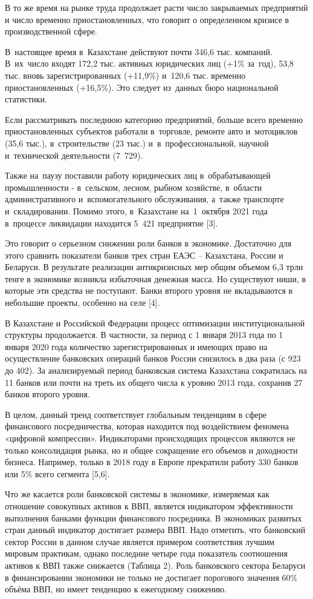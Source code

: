 В то же время на рынке труда продолжает расти число закрываемых
предприятий и число временно приостановленных, что говорит о
определенном кризисе в производственной сфере.

В~настоящее время в~Казахстане действуют почти 346,6 тыс. компаний.
В~их~число входят 172,2 тыс. активных юридических лиц (+1\% за~год),
53,8 тыс. вновь зарегистрированных (+11,9\%) и~120,6 тыс. временно
приостановленных (+16,5\%). Это следует из~данных бюро национальной
статистики.

Если рассматривать последнюю категорию предприятий, больше всего
временно приостановленных субъектов работали в~торговле, ремонте авто
и~мотоциклов (35,6 тыс.), в~строительстве (23 тыс.)
и~в~профессиональной, научной и~технической деятельности (7~729).

Также на~паузу поставили работу юридических лиц в~обрабатывающей
промышленности - в~сельском, лесном, рыбном хозяйстве, в~области
административного и~вспомогательного обслуживания, а~также транспорте
и~складировании. Помимо этого, в~Казахстане на~1~октября 2021 года
в~процессе ликвидации находится 5~421 предприятие {[}3{]}.

Это говорит о серьезном снижении роли банков в экономике. Достаточно для
этого сравнить показатели банков трех стран ЕАЭС -- Казахстана, России и
Беларуси. В результате реализации антикризисных мер общим объемом 6,3
трлн тенге в экономике возникла избыточная денежная масса. Но существуют
ниши, в которые эти средства не поступают. Банки второго уровня не
вкладываются в небольшие проекты, особенно на селе {[}4{]}.

В Казахстане и Российской Федерации процесс оптимизации
институциональной структуры продолжается. В частности, за период с 1
января 2013 года по 1 января 2020 года количество зарегистрированных и
имеющих право на осуществление банковских операций банков России
снизилось в два раза (с 923 до 402). За анализируемый период банковская
система Казахстана сократилась на 11 банков или почти на треть их общего
числа к уровню 2013 года, сохранив 27 банков второго уровня.

В целом, данный тренд соответствует глобальным тенденциям в сфере
финансового посредничества, которая находится под воздействием феномена
«цифровой компрессии». Индикаторами происходящих процессов являются не
только консолидация рынка, но и общее сокращение его объемов и
доходности бизнеса. Например, только в 2018 году в Европе прекратили
работу 330 банков или 5\% всего сегмента {[}5,6{]}.

Что же касается роли банковской системы в экономике, измеряемая как
отношение совокупных активов к ВВП, является индикатором эффективности
выполнения банками функции финансового посредника. В экономиках развитых
стран данный индикатор достигает размера ВВП. Надо отметить, что
банковский сектор России в данном случае является примером соответствия
лучшим мировым практикам, однако последние четыре года показатель
соотношения активов к ВВП также снижается (Таблица 2). Роль банковского
сектора Беларуси в финансировании экономики не только не достигает
порогового значения 60\% объёма ВВП, но имеет тенденцию к ежегодному
снижению.

